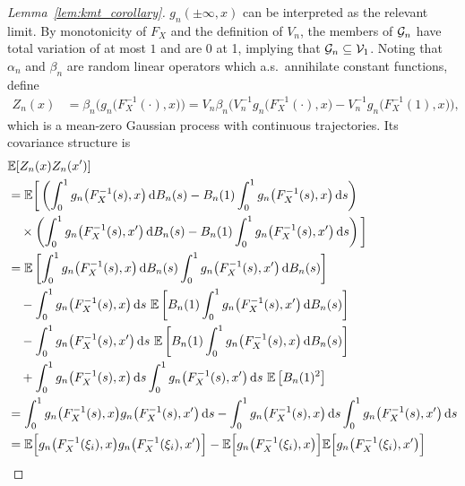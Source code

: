 \begin{proof}[Lemma~\ref{lem:kmt_corollary}]
  $g_n(\pm \infty, x)$
  can be interpreted as
  the relevant limit.
  By monotonicity of $F_X$ and the definition of $V_n$,
  the members of $\mathcal{G}_n$ have total variation of at most $1$
  and are 0 at 1, implying that
  $\mathcal{G}_n \subseteq \mathcal{V}_1$.
  Noting that $\alpha_n$ and $\beta_n$ are random
  linear operators which a.s.\ annihilate
  constant functions,
  define
  \begin{align*}
    Z_n(x)
    &=
    \beta_n \Big(g_n\big(F_X^{-1}(\cdot), x\big)\Big)
    = V_n \beta_n \Big(
      V_n^{-1} g_n\big(F_X^{-1}(\cdot), x\big)
      - V_n^{-1} g_n\big(F_X^{-1}(1), x\big)
    \Big),
  \end{align*}
  which is a mean-zero Gaussian process with continuous trajectories.
  Its covariance structure is
  \begin{align*}
    &\E[Z_n(x) Z_n(x')] \\
    &=
    \E\bigg[
      \left(
        \int_0^1 g_n\big(F_X^{-1}(s),x\big) \diff{B_n(s)}
        - B_n(1) \int_0^1 g_n\big(F_X^{-1}(s),x\big) \diff{s}
      \right) \\
      &\quad\times
      \left(
        \int_0^1 g_n\big(F_X^{-1}(s),x'\big) \diff{B_n(s)}
        - B_n(1) \int_0^1 g_n\big(F_X^{-1}(s),x'\big) \diff{s}
      \right)
    \bigg] \\
    &=
    \E\left[
      \int_0^1 g_n\big(F_X^{-1}(s),x\big) \diff{B_n(s)}
      \int_0^1 g_n\big(F_X^{-1}(s),x'\big) \diff{B_n(s)}
    \right] \\
    &\quad- \int_0^1 g_n\big(F_X^{-1}(s),x\big) \diff{s} \
    \E\left[
      B_n(1) \int_0^1 g_n\big(F_X^{-1}(s),x'\big) \diff{B_n(s)}
    \right] \\
    &\quad-
    \int_0^1 g_n\big(F_X^{-1}(s),x'\big) \diff{s} \
    \E\left[
      B_n(1) \int_0^1 g_n\big(F_X^{-1}(s),x\big) \diff{B_n(s)}
    \right] \\
    &\quad+
    \int_0^1 g_n\big(F_X^{-1}(s),x\big) \diff{s}
    \int_0^1 g_n\big(F_X^{-1}(s),x'\big) \diff{s} \
    \E\left[
      B_n(1)^2
    \right] \\
    &=
    \int_0^1 g_n\big(F_X^{-1}(s),x\big)
    g_n\big(F_X^{-1}(s),x'\big) \diff{s}
    - \int_0^1 g_n\big(F_X^{-1}(s),x\big) \diff{s}
    \int_0^1 g_n\big(F_X^{-1}(s),x'\big) \diff{s} \\
    &=
    \E\Big[
      g_n\big(F_X^{-1}(\xi_i), x\big)
      g_n\big(F_X^{-1}(\xi_i), x'\big)
    \Big]
    - \E\Big[
      g_n\big(F_X^{-1}(\xi_i), x\big)
    \Big]
    \E\Big[
      g_n\big(F_X^{-1}(\xi_i), x'\big)
    \Big] \\

\end{align*}
\end{proof}

